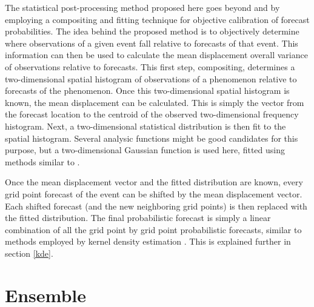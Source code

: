 The statistical post-processing method proposed here goes beyond \cite{Theis2005} and \cite{Sobash2011} by employing a compositing and fitting technique for objective calibration of forecast probabilities. The idea behind the proposed method is to objectively determine where observations of a given event fall relative to forecasts of that event. This information can then be used to calculate the mean displacement overall variance of observations relative to forecasts. This first step, compositing, determines a two-dimensional spatial histogram of observations of a phenomenon relative to forecasts of the phenomenon. Once this two-dimensional spatial histogram is known, the mean displacement can be calculated. This is simply the vector from the forecast location to the centroid of the observed two-dimensional frequency histogram. Next, a two-dimensional statistical distribution is then fit to the spatial histogram. Several analysic functions might be good candidates for this purpose, but a two-dimensional Gaussian function is used here, fitted using methods similar to \cite{Lak2010}.

Once the mean displacement vector and the fitted distribution are known, every grid point forecast of the event can be shifted by the mean displacement vector. Each shifted forecast (and the new neighboring grid points) is then replaced with the fitted distribution. The final probabilistic forecast is simply a linear combination of all the grid point by grid point probabilistic forecasts, similar to methods employed by kernel density estimation \citep{KDE}. This is explained further in section \ref{kde}.




\section{Ensemble}
\label{emethod}
